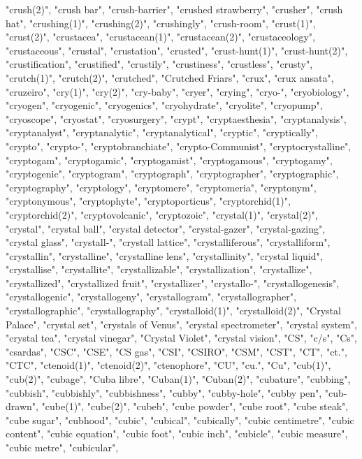 "crush(2)",
"crush bar",
"crush-barrier",
"crushed strawberry",
"crusher",
"crush hat",
"crushing(1)",
"crushing(2)",
"crushingly",
"crush-room",
"crust(1)",
"crust(2)",
"crustacea",
"crustacean(1)",
"crustacean(2)",
"crustaceology",
"crustaceous",
"crustal",
"crustation",
"crusted",
"crust-hunt(1)",
"crust-hunt(2)",
"crustification",
"crustified",
"crustily",
"crustiness",
"crustless",
"crusty",
"crutch(1)",
"crutch(2)",
"crutched",
"Crutched Friars",
"crux",
"crux ansata",
"cruzeiro",
"cry(1)",
"cry(2)",
"cry-baby",
"cryer",
"crying",
"cryo-",
"cryobiology",
"cryogen",
"cryogenic",
"cryogenics",
"cryohydrate",
"cryolite",
"cryopump",
"cryoscope",
"cryostat",
"cryosurgery",
"crypt",
"cryptaesthesia",
"cryptanalysis",
"cryptanalyst",
"cryptanalytic",
"cryptanalytical",
"cryptic",
"cryptically",
"crypto",
"crypto-",
"cryptobranchiate",
"crypto-Communist",
"cryptocrystalline",
"cryptogam",
"cryptogamic",
"cryptogamist",
"cryptogamous",
"cryptogamy",
"cryptogenic",
"cryptogram",
"cryptograph",
"cryptographer",
"cryptographic",
"cryptography",
"cryptology",
"cryptomere",
"cryptomeria",
"cryptonym",
"cryptonymous",
"cryptophyte",
"cryptoporticus",
"cryptorchid(1)",
"cryptorchid(2)",
"cryptovolcanic",
"cryptozoic",
"crystal(1)",
"crystal(2)",
"crystal",
"crystal ball",
"crystal detector",
"crystal-gazer",
"crystal-gazing",
"crystal glass",
"crystall-",
"crystall lattice",
"crystalliferous",
"crystalliform",
"crystallin",
"crystalline",
"crystalline lens",
"crystallinity",
"crystal liquid",
"crystallise",
"crystallite",
"crystallizable",
"crystallization",
"crystallize",
"crystallized",
"crystallized fruit",
"crystallizer",
"crystallo-",
"crystallogenesis",
"crystallogenic",
"crystallogeny",
"crystallogram",
"crystallographer",
"crystallographic",
"crystallography",
"crystalloid(1)",
"crystalloid(2)",
"Crystal Palace",
"crystal set",
"crystals of Venus",
"crystal spectrometer",
"crystal system",
"crystal tea",
"crystal vinegar",
"Crystal Violet",
"crystal vision",
"CS",
"c/s",
"Cs",
"csardas",
"CSC",
"CSE",
"CS gas",
"CSI",
"CSIRO",
"CSM",
"CST",
"CT",
"ct.",
"CTC",
"ctenoid(1)",
"ctenoid(2)",
"ctenophore",
"CU",
"cu.",
"Cu",
"cub(1)",
"cub(2)",
"cubage",
"Cuba libre",
"Cuban(1)",
"Cuban(2)",
"cubature",
"cubbing",
"cubbish",
"cubbishly",
"cubbishness",
"cubby",
"cubby-hole",
"cubby pen",
"cub-drawn",
"cube(1)",
"cube(2)",
"cubeb",
"cube powder",
"cube root",
"cube steak",
"cube sugar",
"cubhood",
"cubic",
"cubical",
"cubically",
"cubic centimetre",
"cubic content",
"cubic equation",
"cubic foot",
"cubic inch",
"cubicle",
"cubic measure",
"cubic metre",
"cubicular",
